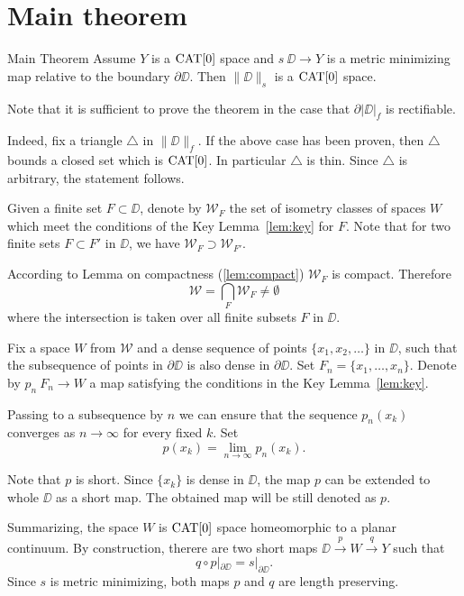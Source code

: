 \documentclass[a4paper,10pt]{amsart}
\begin{document}
\section{Main theorem}

\begin{thm}{Main Theorem}
Assume $Y$ is a $\mathop{\rm CAT}\nolimits[0]$ space 
and $s\:\DD\to Y$ is a metric minimizing map relative to the boundary $\partial\DD$.
Then $\|\DD\|_s$ is a $\mathop{\rm CAT}\nolimits[0]$ space.
\end{thm}


Note that it is sufficient to prove the theorem 
in the case that $\partial |\DD|_f$ is rectifiable.

Indeed, fix a triangle $\triangle$ in $\|\DD\|_f$.
If the above case has been proven, 
then $\triangle$ bounds a closed set which is $\mathop{\rm CAT}\nolimits[0]$.
In particular $\triangle$ is thin.
Since $\triangle$ is arbitrary, the statement follows.

Given a finite set $F\subset \DD$,
denote by $\mathcal{W}_F$
the set of isometry classes of spaces $W$ which meet the conditions of the Key Lemma~\ref{lem:key}
for $F$.
Note that for two finite sets $F\subset F'$ in $\DD$,
we have $\mathcal{W}_F\supset \mathcal{W}_{F'}$.

According to Lemma on compactness (\ref{lem:compact}) $\mathcal{W}_F$ is compact.
Therefore 
\[\mathcal{W}
=
\bigcap_{F}\mathcal{W}_F\ne \emptyset\]
where the intersection is taken over all finite subsets $F$ in $\DD$.

Fix a space $W$ from $\mathcal{W}$
and a dense sequence of points $\{x_1,x_2,\dots\}$ in $\DD$,
such that the subsequence of points in $\partial \DD$
is also dense in $\partial \DD$.
Set $F_n=\{x_1,\dots,x_n\}$.
Denote by $p_n\:F_n\to W$ a map satisfying the conditions in the Key Lemma~\ref{lem:key}.

Passing to a subsequence by $n$ we can ensure that the sequence
$p_n(x_k)$ converges as $n\to\infty$ for every fixed $k$.
Set 
\[p(x_k)=\lim_{n\to\infty} p_n(x_k).\]

Note that $p$ is short.
Since $\{x_k\}$ is dense in $\DD$,
the map $p$ can be extended to whole $\DD$ 
as a short map.
The obtained map will be still denoted as $p$.

Summarizing, the space $W$ is $\mathop{\rm CAT}\nolimits[0]$ space 
homeomorphic to a planar continuum.
By construction, therere are two short maps 
$\DD\xrightarrow{p} W \xrightarrow{q} Y$
such that 
\[q\circ p|_{\partial\DD}=s|_{\partial\DD}.\]
Since $s$ is metric minimizing, both maps $p$ and $q$ are length preserving.
\end{document}
